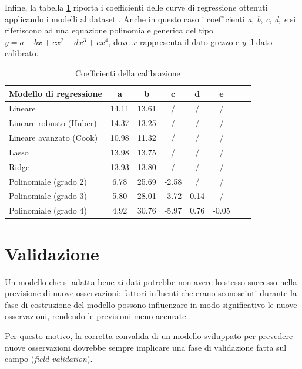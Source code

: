 Infine, la tabella \ref{fig:risultati-pm10-coefficienti} riporta i coefficienti delle curve di regressione ottenuti applicando i modelli al dataset . Anche in questo caso i coefficienti \textit{a}, \textit{b}, \textit{c}, \textit{d}, \textit{e} si riferiscono ad una equazione polinomiale generica del tipo $y=a+bx+cx^2+dx^3+ex^4$, dove $x$ rappresenta il dato grezzo e $y$ il dato calibrato.

\begin{table}[H]
    \footnotesize
    \centering
    \begin{tabular}{|l|c|c|c|c|c|c|c|}
    \hline
        \textbf{Modello di regressione} & \textbf{a} & \textbf{b} & \textbf{c} & \textbf{d} & \textbf{e} \\ \hline
        Lineare & 14.11 & 13.61 & / & / & / \\ \hline
        Lineare robusto (Huber) & 14.37 & 13.25 & / & / & / \\ \hline
        Lineare avanzato (Cook) & 10.98 & 11.32 & / & / & / \\ \hline
        Lasso & 13.98 & 13.75 & / & / & / \\ \hline
        Ridge & 13.93 & 13.80 & / & / & / \\ \hline
        Polinomiale (grado 2) & 6.78 & 25.69 & -2.58 & / & / \\ \hline
        Polinomiale (grado 3) & 5.80 & 28.01 & -3.72 & 0.14 & / \\ \hline
        Polinomiale (grado 4) & 4.92 & 30.76 & -5.97 & 0.76 & -0.05 \\ \hline
    \end{tabular}
    \captionsetup{justification=centering}
    \caption{Coefficienti della calibrazione }
    \label{fig:risultati-pm10-coefficienti}
\end{table}

\section{Validazione}\label{sec:validazione}
Un modello che si adatta bene ai dati potrebbe non avere lo stesso successo nella previsione di nuove osservazioni: fattori influenti che erano sconosciuti durante la fase di costruzione del modello possono influenzare in modo significativo le nuove osservazioni, rendendo le previsioni meno accurate.

Per questo motivo, la corretta convalida di un modello sviluppato per prevedere nuove osservazioni dovrebbe sempre implicare una fase di validazione fatta sul campo (\textit{field validation}).

